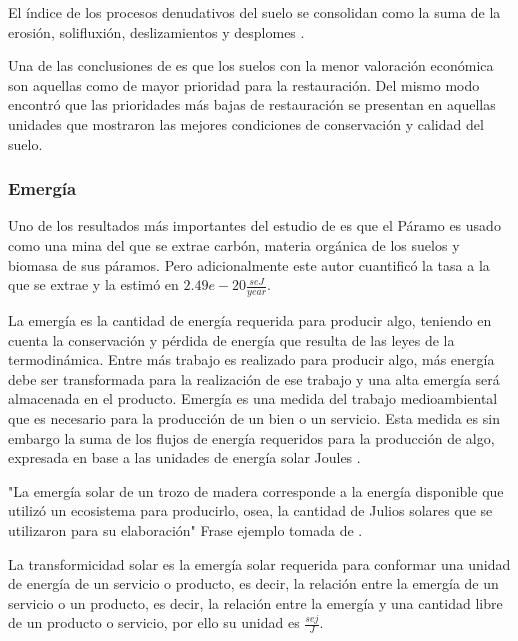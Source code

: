 El índice de los procesos denudativos del suelo se consolidan como la suma de la erosión, solifluxión, deslizamientos y desplomes \citep{Castro-Romero2014}. %



Una de las conclusiones de \citep{Castro-Romero2014} es que los suelos con la menor valoración económica son aquellas como de mayor prioridad para la restauración. Del mismo modo \citep{Castro-Romero2014} encontró que las prioridades más bajas de restauración se presentan en aquellas unidades que mostraron las mejores condiciones de conservación y calidad del suelo.

\subsubsection{Emergía}

Uno de los resultados más importantes del estudio de \citep{Ernesto} es que el Páramo es usado como una mina del que se extrae carbón, materia orgánica de los suelos y biomasa de sus páramos. Pero adicionalmente este autor cuantificó la tasa a la que se extrae y la estimó en $2.49e-20 \frac{seJ}{year}$.

La emergía es la cantidad de energía requerida para producir algo, teniendo en cuenta la conservación y pérdida de energía que resulta de las leyes de la termodinámica. Entre más trabajo es realizado para producir algo, más energía debe ser transformada para la realización de ese trabajo y una alta emergía será almacenada en el producto. Emergía es una medida del trabajo medioambiental que es necesario para la producción de un bien o un servicio. Esta medida es sin embargo la suma de los flujos de energía requeridos para la producción de algo, expresada en base a las unidades de energía solar Joules \citep{lei2014ecological}.

"La emergía solar de un trozo de madera corresponde a la energía disponible que utilizó un ecosistema para producirlo, osea, la cantidad de Julios solares que se utilizaron para su elaboración" Frase ejemplo tomada de \citep{Castro-Romero2014}.

La transformicidad solar es la emergía solar requerida para conformar una unidad de energía de un servicio o producto, es decir, la relación entre la emergía de un servicio o un producto, es decir, la relación entre la emergía y una cantidad libre de un producto o servicio, por ello su unidad es $\frac{sej}{J}$.

